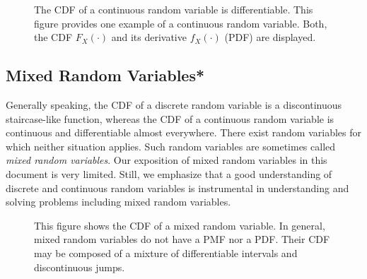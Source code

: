 \begin{figure}[ht]
\begin{center}
\end{center}
\caption{The CDF of a continuous random variable is differentiable.
This figure provides one example of a continuous random variable.
Both, the CDF $F_X(\cdot)$ and its derivative $f_X(\cdot)$ (PDF) are displayed.}
\end{figure}


\subsection{Mixed Random Variables*}

Generally speaking, the CDF of a discrete random variable is a discontinuous staircase-like function, whereas the CDF of a continuous random variable is continuous and differentiable almost everywhere.
There exist random variables for which neither situation applies.
Such random variables are sometimes called \emph{mixed random variables}. 
Our exposition of mixed random variables in this document is very limited.
Still, we emphasize that a good understanding of discrete and continuous random variables is instrumental in understanding and solving problems including mixed random variables.

\begin{figure}[ht]
\begin{center}
\end{center}
\caption{This figure shows the CDF of a mixed random variable.
In general, mixed random variables do not have a PMF nor a PDF.
Their CDF may be composed of a mixture of differentiable intervals and discontinuous jumps.}
\end{figure}


